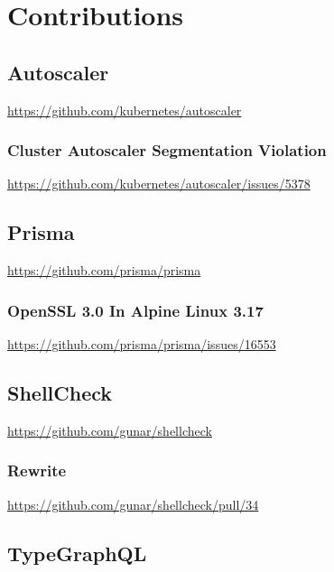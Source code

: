 \chapter{Contributions}
\label{cha:contributions}

\section{Autoscaler}
\label{sec:contributions_autoscaler}

\url{https://github.com/kubernetes/autoscaler}

\subsection{Cluster Autoscaler Segmentation Violation}
\label{subsec:contributions_autoscaler_cluster_autoscaler_segmentation_violation}

\url{https://github.com/kubernetes/autoscaler/issues/5378}

\section{Prisma}
\label{sec:contributions_prisma}

\url{https://github.com/prisma/prisma}

\subsection{OpenSSL 3.0 In Alpine Linux 3.17}
\label{subsec:contributions_prisma_openssl_in_alpine_linux}

\url{https://github.com/prisma/prisma/issues/16553}

\section{ShellCheck}
\label{sec:contributions_shellcheck}

\url{https://github.com/gunar/shellcheck}

\subsection{Rewrite}
\label{subsec:contributions_shellcheck_rewrite}

\url{https://github.com/gunar/shellcheck/pull/34}

\section{TypeGraphQL}
\label{sec:contributions_typegraphql}

